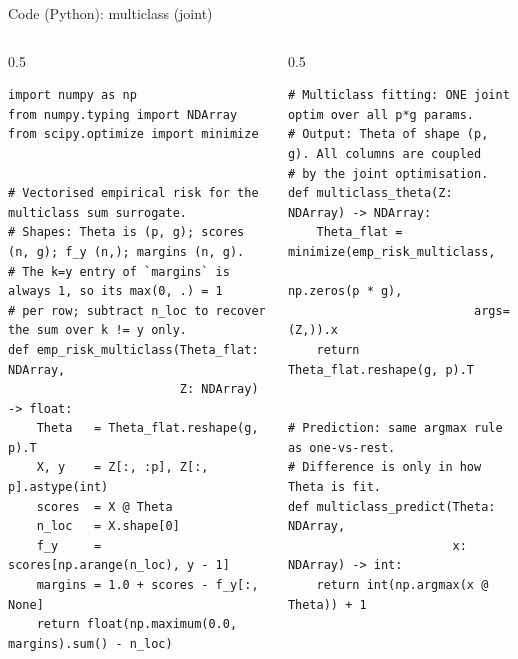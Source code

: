 \documentclass[aspectratio=169]{beamer}
\begin{document}
\begin{frame}[fragile]{Code (Python): multiclass (joint)}
	\scriptsize
	\begin{columns}[T]
	\begin{column}{0.5\textwidth}
		\begin{lstlisting}[style=Pystyle, basicstyle=\ttfamily\fontsize{6pt}{7pt}\selectfont]
import numpy as np
from numpy.typing import NDArray
from scipy.optimize import minimize


# Vectorised empirical risk for the multiclass sum surrogate.
# Shapes: Theta is (p, g); scores (n, g); f_y (n,); margins (n, g).
# The k=y entry of `margins` is always 1, so its max(0, .) = 1
# per row; subtract n_loc to recover the sum over k != y only.
def emp_risk_multiclass(Theta_flat: NDArray,
                        Z: NDArray) -> float:
    Theta   = Theta_flat.reshape(g, p).T
    X, y    = Z[:, :p], Z[:, p].astype(int)
    scores  = X @ Theta
    n_loc   = X.shape[0]
    f_y     = scores[np.arange(n_loc), y - 1]
    margins = 1.0 + scores - f_y[:, None]
    return float(np.maximum(0.0, margins).sum() - n_loc)
		\end{lstlisting}
	\end{column}
	\begin{column}{0.5\textwidth}
		\begin{lstlisting}[style=Pystyle, basicstyle=\ttfamily\fontsize{6pt}{7pt}\selectfont]
# Multiclass fitting: ONE joint optim over all p*g params.
# Output: Theta of shape (p, g). All columns are coupled
# by the joint optimisation.
def multiclass_theta(Z: NDArray) -> NDArray:
    Theta_flat = minimize(emp_risk_multiclass,
                          np.zeros(p * g),
                          args=(Z,)).x
    return Theta_flat.reshape(g, p).T


# Prediction: same argmax rule as one-vs-rest.
# Difference is only in how Theta is fit.
def multiclass_predict(Theta: NDArray,
                       x: NDArray) -> int:
    return int(np.argmax(x @ Theta)) + 1
		\end{lstlisting}
	\end{column}
	\end{columns}
\end{frame}
\end{document}
